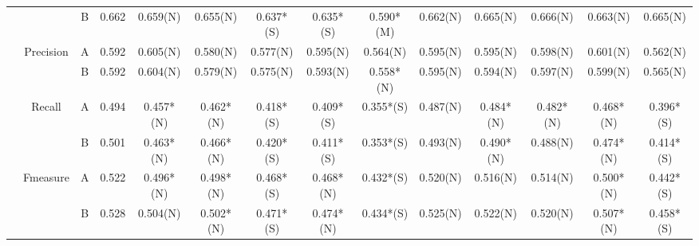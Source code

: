 \begin{table*}
{\begin{tabular}{|c|c|c|c|c|c|c|c|c|c|c|c|c|c|}
                      &                            & B                                                                             & 0.662         & 0.659(N)             & 0.655(N)         & 0.637*(S)       & 0.635*(S)       & 0.590*(M)          & 0.662(N)        & 0.665(N)       & 0.666(N)       & 0.663(N)         & 0.665(N)      \\ \cline{2-14} 
                      & \multirow{2}{*}{Precision} & A                                                                             & 0.592         & 0.605(N)             & 0.580(N)          & 0.577(N)        & 0.595(N)        & 0.564(N)          & 0.595(N)        & 0.595(N)       & 0.598(N)       & 0.601(N)         & 0.562(N)      \\ \cline{3-14} 
                      &                            & B                                                                             & 0.592         & 0.604(N)             & 0.579(N)         & 0.575(N)        & 0.593(N)        & 0.558*(N)         & 0.595(N)        & 0.594(N)       & 0.597(N)       & 0.599(N)         & 0.565(N)      \\ \cline{2-14} 
                      & \multirow{2}{*}{Recall}    & A                                                                             & 0.494         & 0.457*(N)            & 0.462*(N)        & 0.418*(S)       & 0.409*(S)       & 0.355*(S)         & 0.487(N)        & 0.484*(N)      & 0.482*(N)      & 0.468*(N)        & 0.396*(S)     \\ \cline{3-14} 
                      &                            & B                                                                             & 0.501         & 0.463*(N)            & 0.466*(N)        & 0.420*(S)        & 0.411*(S)       & 0.353*(S)         & 0.493(N)        & 0.490*(N)       & 0.488(N)       & 0.474*(N)        & 0.414*(S)     \\ \cline{2-14} 
                      & \multirow{2}{*}{Fmeasure}  & A                                                                             & 0.522         & 0.496*(N)            & 0.498*(N)        & 0.468*(S)       & 0.468*(N)       & 0.432*(S)         & 0.520(N)         & 0.516(N)       & 0.514(N)       & 0.500*(N)          & 0.442*(S)     \\ \cline{3-14} 
                      &                            & B                                                                             & 0.528         & 0.504(N)             & 0.502*(N)        & 0.471*(S)       & 0.474*(N)       & 0.434*(S)         & 0.525(N)        & 0.522(N)       & 0.520(N)        & 0.507*(N)        & 0.458*(S)     \\ \cline{2-14} 

\end{tabular}}
\end{table*}
